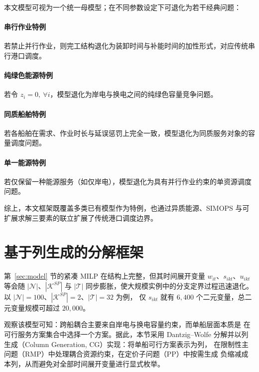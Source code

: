 \documentclass[UTF8, a4paper, 12pt]{ctexart}
\theoremstyle{plain}
\theoremstyle{definition}
\theoremstyle{remark}
\begin{document}
本文模型可视为一个统一母模型；在不同参数设定下可退化为若干经典问题：

\paragraph{串行作业特例}
若禁止并行作业，则完工结构退化为装卸时间与补能时间的加性形式，对应传统串行港口调度。

\paragraph{纯绿色能源特例}
若令 $z_i=0,\ \forall i$，模型退化为岸电与换电之间的纯绿色容量竞争问题。

\paragraph{同质船舶特例}
若各船舶在需求、作业时长与延误惩罚上完全一致，模型退化为同质服务对象的容量调度问题。

\paragraph{单一能源特例}
若仅保留一种能源服务（如仅岸电），模型退化为具有并行作业约束的单资源调度问题。

综上，本文框架既覆盖多类已有模型作为特例，也通过异质能源、SIMOPS 与可扩展求解三要素的联立扩展了传统港口调度边界。


\section{基于列生成的分解框架}
\label{sec:cg}

第~\ref{sec:model} 节的紧凑 MILP 在结构上完整，但其时间展开变量
$w_{it}$、$s_{ikt}$、$u_{ikt}$ 等会随 $|\mathcal{N}|$、$|\mathcal{K}^{SP}|$ 与
$|\mathcal{T}|$ 同步膨胀，使大规模实例中的分支定界过程迅速退化。
以 $|\mathcal{N}| = 100$、$|\mathcal{K}^{SP}| = 2$、$|\mathcal{T}| = 32$ 为例，
仅 $s_{ikt}$ 就有 $6{,}400$ 个二元变量，总二元变量规模可超过 $20{,}000$。

观察该模型可知：跨船耦合主要来自岸电与换电容量约束，而单船层面本质是
在可行服务方案集合中选择一个方案。据此，本节采用 Dantzig--Wolfe
分解并以列生成（Column Generation, CG）实现：将单船可行方案表示为列，
在限制性主问题（RMP）中处理耦合资源约束，在定价子问题（PP）中按需生成
负缩减成本列，从而避免对全部时间展开变量进行显式枚举。
\end{document}
